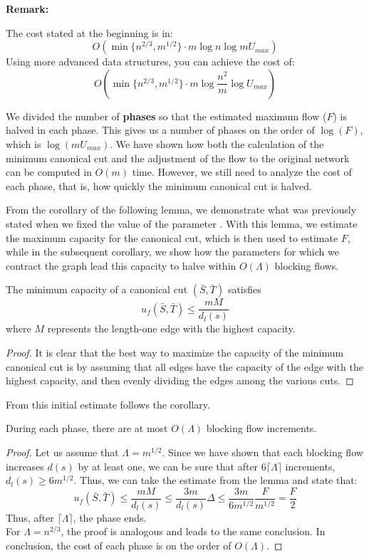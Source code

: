 \textbf{Remark:}
        
        The cost stated at the beginning is in:
        \[O(\min \{n^{2/3}, m^{1/2}\}\cdot m \log n\log m U_{max})\]
        Using more advanced data structures, you can achieve the cost of:
        \[O(\min \{n^{2/3}, m^{1/2}\}\cdot m \log \frac{n^2}{m}\log U_{max})\]


      
        
    We divided the number of \textbf{phases} so that the estimated maximum flow (\( F \)) is halved in each phase.  
    This gives us a number of phases on the order of \( \log(F) \), which is \( \log(m U_{max}) \).  
    We have shown how both the calculation of the minimum canonical cut and the adjustment of the flow to the original network can be computed in \( O(m) \) time.  
    However, we still need to analyze the cost of each phase, that is, how quickly the minimum canonical cut is halved.
    
    From the corollary of the following lemma, we demonstrate what was previously stated when we fixed the value of the parameter \dlt.  
    With this lemma, we estimate the maximum capacity for the canonical cut, which is then used to estimate \( F \), while in the subsequent corollary, we show how the parameters for which we contract the graph lead this capacity to halve within \( O(\Lambda) \) blocking flows.

    \begin{lemma}
        The minimum capacity of a canonical cut $(\bar{S}, \bar{T})$ satisfies
        \[u_f(\bar{S}, \bar{T})\le \frac{mM}{d_l(s)}\]
        where $M$ represents the length-one edge with the highest capacity.
    \end{lemma}
    \begin{proof}
        It is clear that the best way to maximize the capacity of the minimum canonical cut is by assuming that all edges have the capacity of the edge with the highest capacity, and then evenly dividing the edges among the various cuts.

    \end{proof}

    From this initial estimate follows the corollary.
    \begin{corollary}
    During each phase, there are at most $O(\Lambda)$ blocking flow increments.
    \end{corollary}
    \begin{proof}
        Let us assume that \( \Lambda = m^{1/2} \). Since we have shown that each blocking flow increases \( d(s) \) by at least one, we can be sure that after \( 6\lceil \Lambda \rceil \) increments, \( d_l(s) \geq 6 m^{1/2} \).  
        Thus, we can take the estimate from the lemma and state that:  
        \[
        u_f(\bar{S}, \bar{T}) \le \frac{mM}{d_l(s)} \le \frac{3m}{d_l(s)}\Delta \le \frac{3m}{6m^{1/2}} \frac{F}{m^{1/2}} = \frac{F}{2}
        \]
        Thus, after \( \lceil \Lambda \rceil \), the phase ends.\\  
        For \( \Lambda = n^{2/3} \), the proof is analogous and leads to the same conclusion.  
        In conclusion, the cost of each phase is on the order of \( O(\Lambda) \).
    \end{proof}
    \newpage

